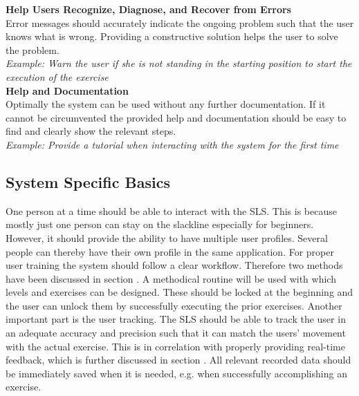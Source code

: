 \textbf{Help Users Recognize, Diagnose, and Recover from Errors}\\
Error messages should accurately indicate the ongoing problem such that the user knows what is wrong. Providing a constructive solution helps the user to solve the problem.\\
\textit{Example: Warn the user if she is not standing in the starting position to start the execution of the exercise}\\

\textbf{Help and Documentation}\\
Optimally the system can be used without any further documentation. If it cannot be circumvented the provided help and documentation should be easy to find and clearly show the relevant steps.\\
\textit{Example: Provide a tutorial when interacting with the system for the first time}

\subsection{System Specific Basics}\label{systemBasics}
One person at a time should be able to interact with the SLS.
This is because mostly just one person can stay on the slackline especially for beginners.
However, it should provide the ability to have multiple user profiles.
Several people can thereby have their own profile in the same application.
For proper user training the system should follow a clear workflow.
Therefore two methods have been discussed in section \textit{}.
A methodical routine will be used with which levels and exercises can be designed.
These should be locked at the beginning and the user can unlock them by successfully executing the prior exercises.
Another important part is the user tracking.
The SLS should be able to track the user in an adequate accuracy and precision such that it can match the users' movement with the actual exercise. %
This is in correlation with properly providing real-time feedback, which is further discussed in section \textit{}.
All relevant recorded data should be immediately saved when it is needed, e.g. when successfully accomplishing an exercise.

\begin{comment}
- System should be able to track user appropriately
- All relevant data should be immediately saved when it is needed (unlocking exercise/stage, failing/accomplish exercise)
- Information about where the user currently is should be given --> title
- User selection
- Also a possibility to go to the last screen if she misclicks should be given.
\end{comment}